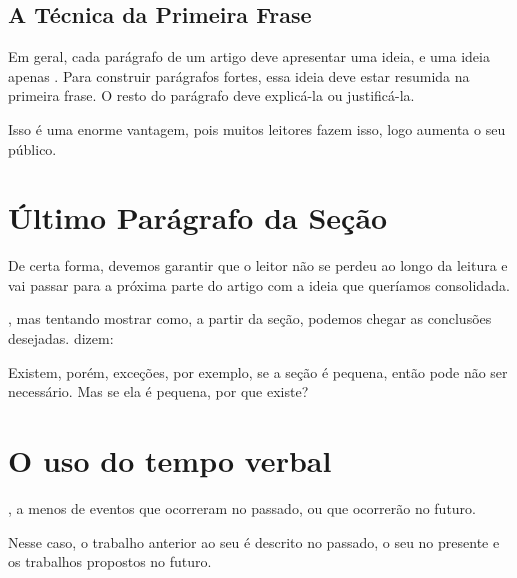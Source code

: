 \documentclass{article}
\begin{document}
\subsection{A Técnica da Primeira Frase}

 Em geral, cada parágrafo de um artigo deve apresentar uma ideia, e uma ideia apenas . Para construir parágrafos fortes, essa ideia deve estar resumida na primeira frase. O resto do parágrafo deve explicá-la ou justificá-la.

 Isso é uma enorme vantagem, pois muitos leitores fazem isso, logo aumenta o seu público. 

\section{Último Parágrafo da Seção}

  De certa forma, devemos garantir que o leitor não se perdeu ao longo da leitura e vai passar para a próxima parte do artigo com a ideia que queríamos consolidada.

, mas tentando mostrar como, a partir da seção, podemos chegar as conclusões desejadas. \citet{Knuth:1997} dizem:


Existem, porém, exceções, por exemplo, se a seção é pequena, então pode não ser necessário. Mas se ela é pequena, por que existe?


\section{O uso do tempo verbal}

, a menos de eventos que ocorreram no passado, ou que ocorrerão no futuro.

 Nesse caso, o trabalho anterior ao seu é descrito no passado, o seu no presente e os trabalhos propostos no futuro.
\end{document}
